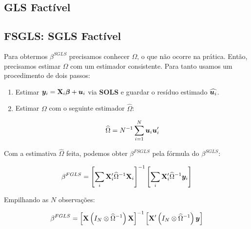\documentclass[11pt, oneside, a4paper, article]{article}
\numberwithin{equation}{section}
\begin{document}
\begin{description}
\begin{description}
\clearpage
\section{GLS Factível}

\noindent
\citet[Sec.7.5 -- Feasible GLS, p.153]{wool-2010} 

\subsection*{FSGLS: SGLS Factível}

Para obtermos $\beta^{SGLS}$ precisamos conhecer $\Omega$, o que não ocorre na prática.
Então, precisamos estimar $\Omega$ com um estimador consistente.
Para tanto usamos um procedimento de dois passos:

\begin{enumerate}
\item  %
Estimar $\boldsymbol{y}_{i} = \mathbf{X}_{i} \boldsymbol{\beta} + \boldsymbol{u}_{i}$ via \textbf{SOLS} e guardar o resíduo estimado $\widehat{\boldsymbol{u}_{i}}$.

\item  %
Estimar $\Omega$ com o seguinte estimador $\widehat{\Omega}$:

\vspace{-1.5 em}
\begin{align*}
	\widehat{\Omega} 
	= 
	N^{-1} \sum_{i=1}^{N} \boldsymbol{u}_{i} \boldsymbol{u}_{i}'
\end{align*}
\end{enumerate}

Com a estimativa $\widehat{\Omega}$ feita, podemos obter $\beta^{FSGLS}$ pela fórmula do $\beta^{SGLS}$:

\vspace{-1.5 em}
\begin{align*}
	\beta^{FGLS}
	= 
	\left[ 
		\sum_{i} \mathbf{X}_{i}' \widehat{\Omega}^{-1} \mathbf{X}_{i}
	\right]^{-1}
	\left[ 
		\sum_{i} \mathbf{X}_{i}' \widehat{\Omega}^{-1} \boldsymbol{y}_{i}
	\right]
\end{align*}

Empilhando as $N$ observações:

\vspace{-1.5 em}
\begin{align*}
\beta^{FGLS}
= 
\left[ \mathbf{X} \left( I_{N} \otimes \widehat{\Omega}^{-1} \right) \mathbf{X} \right]^{-1}
\left[ \mathbf{X}' \left( I_{N} \otimes \widehat{\Omega}^{-1} \right) \boldsymbol{y} \right]
\end{align*}


\end{description}
\end{description}
\end{document}
